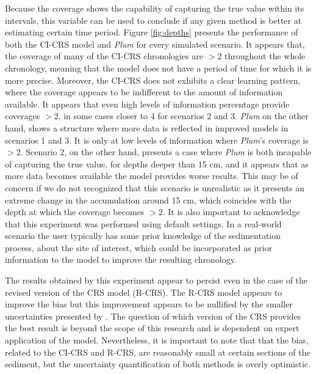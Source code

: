 \documentclass [10pt] {article}
\begin{document}
Because the coverage shows the capability of capturing the true value within its intervals, this variable can be used to conclude if any given method is better at estimating certain time period.
Figure \ref{fig:depths} presents the performance of both the CI-CRS model and \textit{Plum} for every simulated scenario.
It appears that, the coverage of many of the CI-CRS chronologies are $> 2$ throughout the whole chronology, meaning that the model does not have a period of time for which it is more precise. 
Moreover, the CI-CRS does not exhibits a clear learning pattern, where the coverage appears to be indifferent to the amount of information available.
It appears that even high levels of information percentage provide coverages $> 2$, in some cases closer to 4 for scenarios 2 and 3.
\textit{Plum} on the other hand, shows a structure where more data is reflected in improved models in scenarios 1 and 3.
It is only at low levels of information where \textit{Plum}'s coverage is $>2$.
Scenario 2, on the other hand, presents a case where \textit{Plum} is both incapable of capturing the true value, for depths deeper than 15 cm, and it appears that as more data becomes available the model provides worse results. 
This may be of concern if we do not recognized that this scenario is unrealistic as it presents an extreme change in the accumulation around 15 cm, which coincides with the depth at which the coverage becomes $>2$.
It is also important to acknowledge that this experiment was performed using default settings.  
In a real-world scenario the user typically has some prior knowledge of the sedimentation process, about the site of interest, which could be incorporated as prior information to the model to improve the resulting chronology.

The results obtained by this experiment appear to persist even in the case of the revised version of the CRS model (R-CRS).
The R-CRS model appears to improve the bias but this improvement appears to be nullified by the smaller uncertainties presented by \citet{Sanchez-Cabeza2014}.
The question of which version of the CRS provides the best result is beyond the scope of this research and is dependent on expert application of the model.
Nevertheless, it is important to note that that the bias, related to the CI-CRS and R-CRS, are reasonably small at certain sections of the sediment, but the uncertainty quantification of both methods is overly optimistic.  
\end{document}
